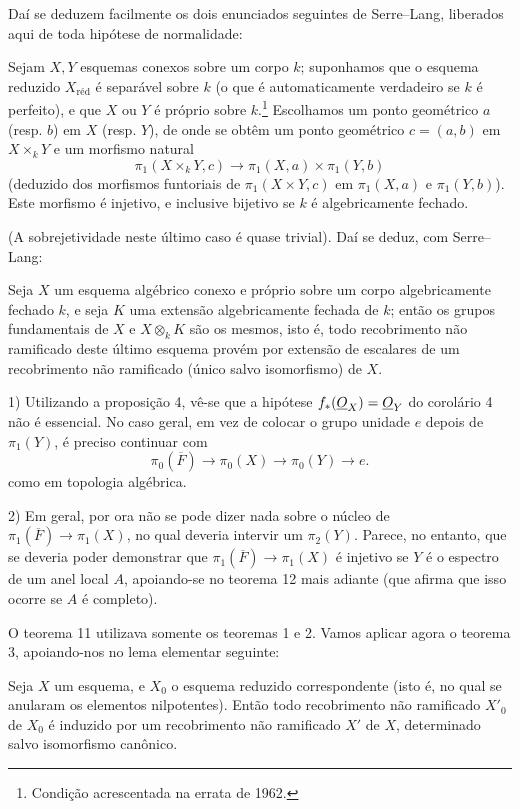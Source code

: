Daí se deduzem facilmente os dois enunciados seguintes de Serre--Lang,
liberados aqui de toda hipótese de normalidade:

 Sejam $X,Y$ esquemas conexos sobre um corpo $k$;
suponhamos que o esquema reduzido $X_{\mathrm{réd}}$ é separável sobre $k$
(o que é automaticamente verdadeiro se $k$ é perfeito), e que $X$ ou $Y$ é
próprio sobre $k$.\footnote{Condição acrescentada na errata de 1962.}
Escolhamos um ponto geométrico $a$ (resp. $b$) em $X$ (resp. $Y$), de onde se
obtêm um ponto geométrico $c=(a,b)$ em $X\times_kY$ e um morfismo natural
\[
  \pi_1(X\times_kY,c)\longrightarrow
  \pi_1(X,a)\times\pi_1(Y,b)
\]
(deduzido dos morfismos funtoriais de $\pi_1(X\times Y,c)$ em $\pi_1(X,a)$
e $\pi_1(Y,b)$). Este morfismo é injetivo, e inclusive bijetivo se $k$ é
algebricamente fechado.

(A sobrejetividade neste último caso é quase trivial). Daí se deduz,
com Serre--Lang:

 Seja $X$ um esquema algébrico conexo e próprio sobre um corpo
algebricamente fechado $k$, e seja $K$ uma extensão algebricamente fechada
de $k$; então os grupos fundamentais de $X$ e $X\otimes_kK$ são os
mesmos, isto é, todo recobrimento não ramificado deste último esquema
provém por extensão de escalares de um recobrimento não ramificado (único
salvo isomorfismo) de $X$.


1) Utilizando a proposição 4, vê-se que a hipótese
$f_*(\underline{O}_X)=\underline{O}_Y$ do corolário 4 não é essencial. No caso geral, em vez
de colocar o grupo unidade $e$ depois de $\pi_1(Y)$, é preciso continuar com
\[
  \pi_0(\overline F)\longrightarrow\pi_0(X)
  \longrightarrow\pi_0(Y)\longrightarrow e.
\]
como em topologia algébrica.

2) Em geral, por ora não se pode dizer nada sobre o núcleo de
$\pi_1(\overline F)\longrightarrow\pi_1(X)$, no qual deveria intervir um
$\pi_2(Y)$. Parece, no entanto, que se deveria poder demonstrar que
$\pi_1(\overline F)\longrightarrow\pi_1(X)$ é injetivo se $Y$ é o espectro
de um anel local $A$, apoiando-se no teorema 12 mais adiante (que afirma que
isso ocorre se $A$ é completo).

O teorema 11 utilizava somente os teoremas 1 e 2. Vamos aplicar agora o
teorema 3, apoiando-nos no lema elementar seguinte:

 Seja $X$ um esquema, e $X_0$ o esquema reduzido correspondente
(isto é, no qual se anularam os elementos nilpotentes). Então todo
recobrimento não ramificado $X'_0$ de $X_0$ é induzido por um recobrimento
não ramificado $X'$ de $X$, determinado salvo isomorfismo canônico.

